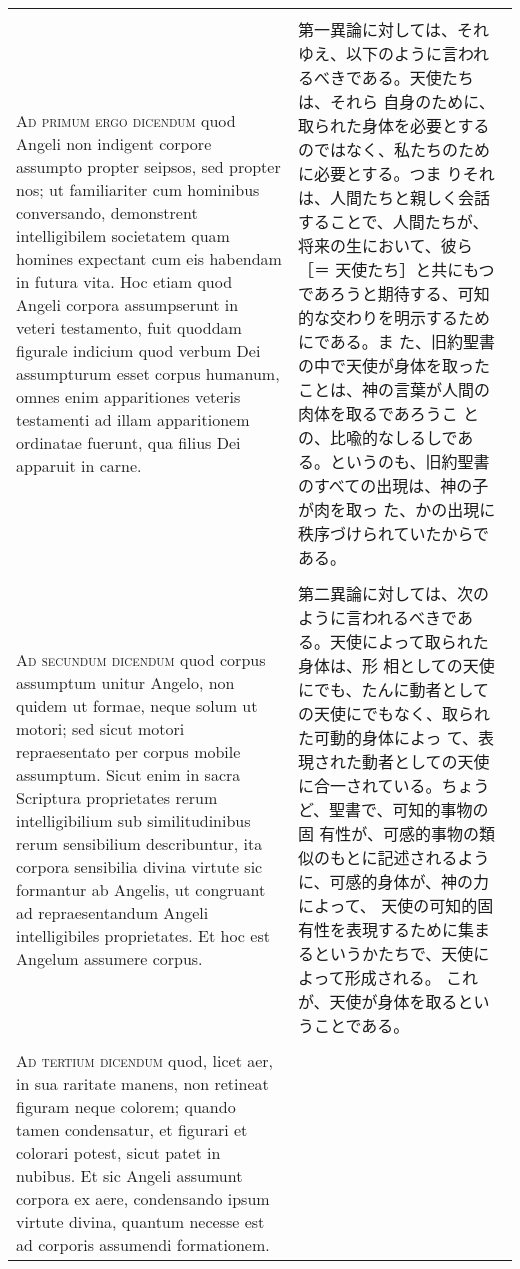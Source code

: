 \documentclass[10pt]{jsarticle} %
\begin{document}
\begin{longtable}{p{21em}p{21em}}
\\\\


{\scshape Ad primum ergo dicendum} quod Angeli non
indigent corpore assumpto propter seipsos, sed propter nos; ut
familiariter cum hominibus conversando, demonstrent intelligibilem
societatem quam homines expectant cum eis habendam in futura vita. Hoc
etiam quod Angeli corpora assumpserunt in veteri testamento, fuit
quoddam figurale indicium quod verbum Dei assumpturum esset corpus
humanum, omnes enim apparitiones veteris testamenti ad illam
apparitionem ordinatae fuerunt, qua filius Dei apparuit in carne.

&

第一異論に対しては、それゆえ、以下のように言われるべきである。天使たちは、それら
自身のために、取られた身体を必要とするのではなく、私たちのために必要とする。つま
りそれは、人間たちと親しく会話することで、人間たちが、将来の生において、彼ら［＝
天使たち］と共にもつであろうと期待する、可知的な交わりを明示するためにである。ま
た、旧約聖書の中で天使が身体を取ったことは、神の言葉が人間の肉体を取るであろうこ
との、比喩的なしるしである。というのも、旧約聖書のすべての出現は、神の子が肉を取っ
た、かの出現に秩序づけられていたからである。

\\\\


{\scshape Ad secundum dicendum} quod corpus assumptum unitur Angelo, non quidem
ut formae, neque solum ut motori; sed sicut motori repraesentato per corpus
mobile assumptum. Sicut enim in sacra Scriptura proprietates rerum
intelligibilium sub similitudinibus rerum sensibilium describuntur, ita corpora
sensibilia divina virtute sic formantur ab Angelis, ut congruant ad
repraesentandum Angeli intelligibiles proprietates. Et hoc est Angelum assumere
corpus.

&

第二異論に対しては、次のように言われるべきである。天使によって取られた身体は、形
相としての天使にでも、たんに動者としての天使にでもなく、取られた可動的身体によっ
て、表現された動者としての天使に合一されている。ちょうど、聖書で、可知的事物の固
有性が、可感的事物の類似のもとに記述されるように、可感的身体が、神の力によって、
天使の可知的固有性を表現するために集まるというかたちで、天使によって形成される。
これが、天使が身体を取るということである。


\\\\


{\scshape Ad tertium dicendum} quod, licet aer, in sua
raritate manens, non retineat figuram neque colorem; quando tamen
condensatur, et figurari et colorari potest, sicut patet in nubibus. Et
sic Angeli assumunt corpora ex aere, condensando ipsum virtute divina,
quantum necesse est ad corporis assumendi formationem.


\end{longtable}
\end{document}
